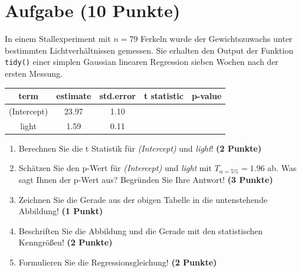 \documentclass[a4paper, 10pt]{scrartcl}\usepackage[]{graphicx}\usepackage[]{xcolor}
\begin{document}
\section{Aufgabe \hfill (10 Punkte)}



In einem Stallexperiment mit $n = 79$ Ferkeln wurde der
Gewichtszuwachs unter bestimmten Lichtverh{\"a}ltnissen gemessen. Sie erhalten
den \Rlogo Output der Funktion \texttt{tidy()} einer simplen Gaussian linearen
Regression sieben Wochen nach der ersten Messung.

\begin{table}[!h]
\centering\begingroup\fontsize{14}{16}\selectfont

\begin{tabular}{ccccc}
\toprule
term & estimate & std.error & t statistic & p-value\\
\midrule
(Intercept) & 23.97 & 1.10 &  & \\
light & 1.59 & 0.11 &  & \\
\bottomrule
\end{tabular}
\endgroup{}
\end{table}



\begin{enumerate}
\item Berechnen Sie die t Statistik f{\"u}r \textit{(Intercept)} und
  \textit{light}! \textbf{(2 Punkte)}
\item Sch{\"a}tzen Sie den p-Wert f{\"u}r \textit{(Intercept)} und
  \textit{light} mit $T_{\alpha = 5\%} = 1.96$ ab. Was sagt Ihnen der p-Wert aus?
  Begr{\"u}nden Sie Ihre Antwort! \textbf{(3 Punkte)}
\item Zeichnen Sie die Gerade aus der obigen Tabelle in die untenstehende
  Abbildung! \textbf{(1 Punkt)}
\item Beschriften Sie die Abbildung und die Gerade mit den statistischen
  Kenngr{\"o}{\ss}en! \textbf{(2 Punkte)}
\item Formulieren Sie die Regressionsgleichung! \textbf{(2 Punkte)}
\end{enumerate}
\end{document}
